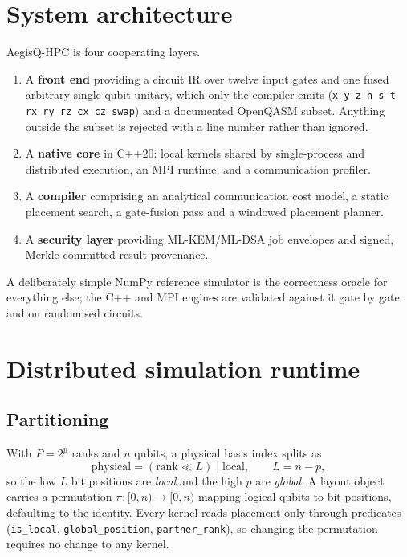 \documentclass[11pt]{article}
\begin{document}
\section{System architecture}

AegisQ-HPC is four cooperating layers.

\begin{enumerate}
\item A \textbf{front end} providing a circuit IR over twelve input gates
  and one fused arbitrary single-qubit unitary, which only the compiler emits
  (\texttt{x y z h s t rx ry rz cx cz swap}) and a documented OpenQASM subset.
  Anything outside the subset is rejected with a line number rather than
  ignored.
\item A \textbf{native core} in C++20: local kernels shared by single-process
  and distributed execution, an MPI runtime, and a communication profiler.
\item A \textbf{compiler} comprising an analytical communication cost model, a
  static placement search, a gate-fusion pass and a windowed placement
  planner.
\item A \textbf{security layer} providing ML-KEM/ML-DSA job envelopes and
  signed, Merkle-committed result provenance.
\end{enumerate}

A deliberately simple NumPy reference simulator is the correctness oracle for
everything else; the C++ and MPI engines are validated against it gate by gate
and on randomised circuits.

\section{Distributed simulation runtime}

\subsection{Partitioning}

With $P = 2^p$ ranks and $n$ qubits, a physical basis index splits as
\begin{equation}
\text{physical} = (\text{rank} \ll L) \mathbin{|} \text{local}, \qquad L = n - p ,
\end{equation}
so the low $L$ bit positions are \emph{local} and the high $p$ are
\emph{global}. A layout object carries a permutation
$\pi : [0,n) \to [0,n)$ mapping logical qubits to bit positions, defaulting to
the identity. Every kernel reads placement only through predicates
(\texttt{is\_local}, \texttt{global\_position}, \texttt{partner\_rank}), so
changing the permutation requires no change to any kernel.
\end{document}

